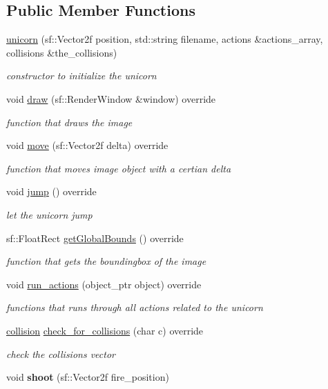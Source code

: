 \subsection*{Public Member Functions}
\begin{DoxyCompactItemize}
\item 
\hyperlink{classunicorn_a78330523ca0b21ed472dd66498086199}{unicorn} (sf\+::\+Vector2f position, std\+::string filename, actions \&actions\+\_\+array, collisions \&the\+\_\+collisions)
\begin{DoxyCompactList}\small\item\em constructor to initialize the unicorn \end{DoxyCompactList}\item 
void \hyperlink{classunicorn_a570c34d5669a8d2a61bdc1481e6f9dee}{draw} (sf\+::\+Render\+Window \&window) override
\begin{DoxyCompactList}\small\item\em function that draws the image \end{DoxyCompactList}\item 
void \hyperlink{classunicorn_a162f200a68342f7bc0baaf17c8cf3f9f}{move} (sf\+::\+Vector2f delta) override
\begin{DoxyCompactList}\small\item\em function that moves image object with a certian delta \end{DoxyCompactList}\item 
void \hyperlink{classunicorn_a07d5ca4e66632c0e871221a27146805a}{jump} () override
\begin{DoxyCompactList}\small\item\em let the unicorn jump \end{DoxyCompactList}\item 
sf\+::\+Float\+Rect \hyperlink{classunicorn_a1bac09fc59b04f14f5a093bc4daa04da}{get\+Global\+Bounds} () override
\begin{DoxyCompactList}\small\item\em function that gets the boundingbox of the image \end{DoxyCompactList}\item 
void \hyperlink{classunicorn_aadb47a9981c46d6add8704074df117df}{run\+\_\+actions} (object\+\_\+ptr object) override
\begin{DoxyCompactList}\small\item\em functions that runs through all actions related to the unicorn \end{DoxyCompactList}\item 
\hyperlink{structcollision}{collision} \hyperlink{classunicorn_a40fe782f273abf46f6121db9aa4bf77a}{check\+\_\+for\+\_\+collisions} (char c) override
\begin{DoxyCompactList}\small\item\em check the collisions vector \end{DoxyCompactList}\item 
void {\bfseries shoot} (sf\+::\+Vector2f fire\+\_\+position)\hypertarget{classunicorn_a95c4a4123e38e413c01323a1966f9ed1}{}\label{classunicorn_a95c4a4123e38e413c01323a1966f9ed1}

\end{DoxyCompactItemize}
